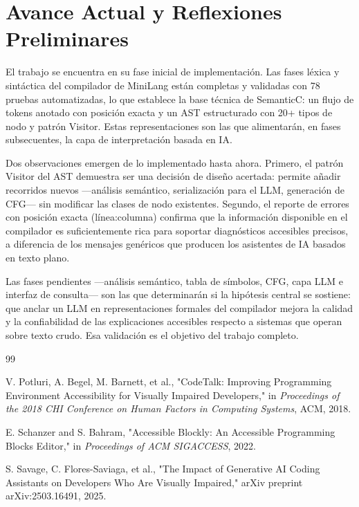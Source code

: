 \documentclass[conference]{IEEEtran}
\begin{document}
\section{Avance Actual y Reflexiones Preliminares}

El trabajo se encuentra en su fase inicial de implementación. Las fases léxica y sintáctica del compilador de MiniLang están completas y validadas con 78 pruebas automatizadas, lo que establece la base técnica de SemanticC: un flujo de tokens anotado con posición exacta y un AST estructurado con 20+ tipos de nodo y patrón Visitor. Estas representaciones son las que alimentarán, en fases subsecuentes, la capa de interpretación basada en IA.

Dos observaciones emergen de lo implementado hasta ahora. Primero, el patrón Visitor del AST demuestra ser una decisión de diseño acertada: permite añadir recorridos nuevos —análisis semántico, serialización para el LLM, generación de CFG— sin modificar las clases de nodo existentes. Segundo, el reporte de errores con posición exacta (línea:columna) confirma que la información disponible en el compilador es suficientemente rica para soportar diagnósticos accesibles precisos, a diferencia de los mensajes genéricos que producen los asistentes de IA basados en texto plano.

Las fases pendientes —análisis semántico, tabla de símbolos, CFG, capa LLM e interfaz de consulta— son las que determinarán si la hipótesis central se sostiene: que anclar un LLM en representaciones formales del compilador mejora la calidad y la confiabilidad de las explicaciones accesibles respecto a sistemas que operan sobre texto crudo. Esa validación es el objetivo del trabajo completo.


\begin{thebibliography}{99}

V. Potluri, A. Begel, M. Barnett, et al.,
"CodeTalk: Improving Programming Environment Accessibility for Visually Impaired Developers,"
in \textit{Proceedings of the 2018 CHI Conference on Human Factors in Computing Systems}, ACM, 2018.

E. Schanzer and S. Bahram,
"Accessible Blockly: An Accessible Programming Blocks Editor,"
in \textit{Proceedings of ACM SIGACCESS}, 2022.

S. Savage, C. Flores-Saviaga, et al.,
"The Impact of Generative AI Coding Assistants on Developers Who Are Visually Impaired,"
arXiv preprint arXiv:2503.16491, 2025.

\end{thebibliography}
\end{document}
